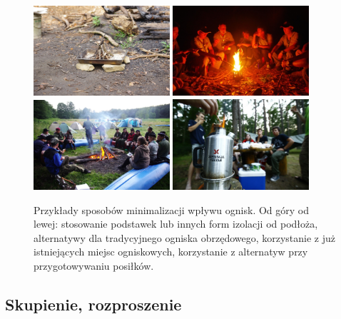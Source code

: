 \begin{figure}[!htb]
	\begin{center}
		\includegraphics[width=0.45\textwidth]{obrazy/ognisko_na_podstawce}
		\includegraphics[width=0.45\textwidth]{obrazy/ognisko_w_pojemniku_klimat}
		\includegraphics[width=0.45\textwidth]{obrazy/ognisko_istniejace}
		\includegraphics[width=0.45\textwidth]{obrazy/Jedzenie/kettle}
	\end{center}
	\caption[Sposoby minimalizacji wpływu ognisk]{Przykłady sposobów minimalizacji wpływu ognisk. Od góry od lewej: stosowanie podstawek lub innych form izolacji od podłoża, alternatywy dla tradycyjnego ogniska obrzędowego, korzystanie z już istniejących miejsc ogniskowych, korzystanie z alternatyw przy przygotowywaniu posiłków.}
\end{figure}

\subsection{Skupienie, rozproszenie}